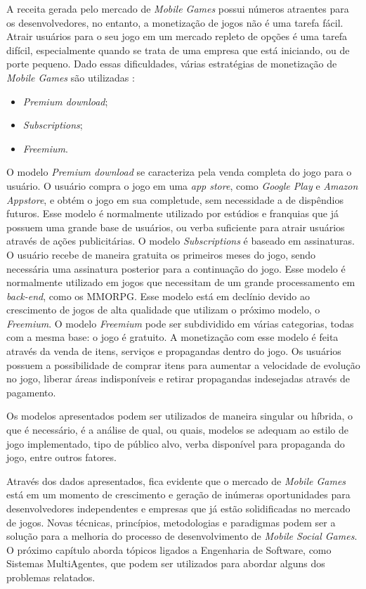 A receita gerada pelo mercado de \textit{Mobile Games} possui números atraentes para os desenvolvedores, no entanto, a monetização de jogos não é uma tarefa fácil. Atrair usuários para o seu jogo em um mercado repleto de opções é uma tarefa difícil, especialmente quando se trata de uma empresa que está iniciando, ou de porte pequeno. Dado essas dificuldades, várias estratégias de monetização de \textit{Mobile Games} são utilizadas \cite{fields2014}:

\begin{itemize}
  \item \textit{Premium download};
  \item \textit{Subscriptions};
  \item \textit{Freemium}.
\end{itemize}

O modelo \textit{Premium download} se caracteriza pela venda completa do jogo para o usuário. O usuário compra o jogo em uma \textit{app store}, como \textit{Google Play} e \textit{Amazon Appstore}, e obtém o jogo em sua completude, sem necessidade a de dispêndios futuros. Esse modelo é normalmente utilizado por estúdios e franquias que já possuem uma grande base de usuários, ou verba suficiente para atrair usuários através de ações publicitárias.
O modelo \textit{Subscriptions} é baseado em assinaturas. O usuário recebe de maneira gratuita os primeiros meses do jogo, sendo necessária uma assinatura posterior para a continuação do jogo. Esse modelo é normalmente utilizado em jogos que necessitam de um grande processamento em \textit{back-end}, como os MMORPG. Esse modelo está em declínio devido ao crescimento de jogos de alta qualidade que utilizam o próximo modelo, o \textit{Freemium}.
O modelo \textit{Freemium} pode ser subdividido em várias categorias, todas com a mesma base: o jogo é gratuito. A monetização com esse modelo é feita através da venda de itens, serviços e propagandas dentro do jogo. Os usuários possuem a possibilidade de comprar itens para aumentar a velocidade de evolução no jogo, liberar áreas indisponíveis e retirar propagandas indesejadas através de pagamento.

Os modelos apresentados podem ser utilizados de maneira singular ou híbrida, o que é necessário, é a análise de qual, ou quais, modelos se adequam ao estilo de jogo implementado, tipo de público alvo, verba disponível para propaganda do jogo, entre outros fatores.

Através dos dados apresentados, fica evidente que o mercado de \textit{Mobile Games} está em um momento de crescimento e geração de inúmeras oportunidades para desenvolvedores independentes e empresas que já estão solidificadas no mercado de jogos. Novas técnicas, princípios, metodologias e paradigmas podem ser a solução para a melhoria do processo de desenvolvimento de \textit{Mobile Social Games}. O próximo capítulo aborda tópicos ligados a Engenharia de Software, como Sistemas MultiAgentes, que podem ser utilizados para abordar alguns dos problemas relatados.

